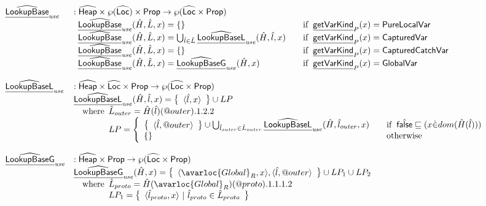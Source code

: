\[
\begin{array}{ll}
\ahf{LookupBase}_{\it use} & : \aHeap \times \powerset{\aLoc} \times \SF{Prop} \rightarrow \powerset{\aLoc \times \SF{Prop}}\\
& 
\begin{array}{ll}
  \ahf{LookupBase}_{\it use}(\hat{H},\hat{L},x) = \set{}&\quad\ifc{\chf{getVarKind}_P(x)=\SF{PureLocalVar}}\\
  \ahf{LookupBase}_{\it use}(\hat{H},\hat{L},x) = \bigcup_{\hat{l}\in\hat{L}}\ahf{LookupBaseL}_{\it use}(\hat{H},\hat{l},x)&\quad\ifc{\chf{getVarKind}_P(x)=\SF{CapturedVar}}\\
  \ahf{LookupBase}_{\it use}(\hat{H},\hat{L},x) = \set{}&\quad\ifc{\chf{getVarKind}_P(x)=\SF{CapturedCatchVar}}\\
  \ahf{LookupBase}_{\it use}(\hat{H},\hat{L},x) = \ahf{LookupBaseG}_{\it use}(\hat{H},x)&\quad\ifc{\chf{getVarKind}_P(x)=\SF{GlobalVar}}
\end{array}
\\\\
\ahf{LookupBaseL}_{\it use} & : \aHeap \times \aLoc \times \SF{Prop} \rightarrow \powerset{\aLoc \times \SF{Prop}}\\
& \ahf{LookupBaseL}_{\it use}(\hat{H},\hat{l},x) = \set{\langle\hat{l}, x\rangle} \cup LP\\
& \quad\wherec{
  \hat{L}_{outer} = \hat{H}(\hat{l})(\varprop{outer}).1.2.2\\
  LP = \left\{
    \begin{array}{ll}
      \set{\langle \hat{l},\varprop{outer}\rangle} \cup \bigcup_{\hat{l}_{outer}\in\hat{L}_{outer}}\ahf{LookupBaseL}_{\it use}(\hat{H},\hat{l}_{outer},x)
        & \quad\ifc{\afalse\sqsubseteq (x\dot{\in}dom(\hat{H}(\hat{l})))}\\
      \set{} & \quad\owc
    \end{array}
  \right.\\
}
\\\\
\ahf{LookupBaseG}_{\it use} & : \aHeap \times \SF{Prop} \rightarrow \powerset{\aLoc \times \SF{Prop}}\\
& \ahf{LookupBaseG}_{\it use}(\hat{H},x) = \set{\langle\avarloc{Global}_R, x\rangle,\langle\hat{l}, \varprop{outer}\rangle}\cup LP_1 \cup LP_2\\
& \quad\wherec{
  \hat{L}_{proto} = \hat{H}(\avarloc{Global}_R)(\varprop{proto}).1.1.1.2\\
  LP_1 = \set{\langle \hat{l}_{proto},x\rangle ~|~ \hat{l}_{proto}\in\hat{L}_{proto}}\\
}
\end{array}\]
